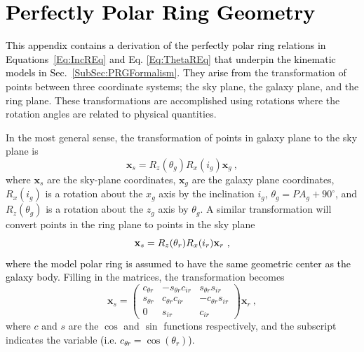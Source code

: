 \documentclass[fleqn,usenatbib]{mnras}
\newcommand{\KS}[1]{\textcolor{black}{#1}}
\begin{document}
\section{\KS{Perfectly Polar Ring Geometry}}\label{Sec:Appendix_PRMath}

\KS{This appendix contains a derivation of the perfectly polar ring relations in Equations~\ref{Eq:IncREq} and Eq. \ref{Eq:ThetaREq} that underpin the kinematic models in Sec.~\ref{SubSec:PRGFormalism}. They arise from} the transformation of points between three coordinate systems; the sky plane, the galaxy plane, and the ring plane.  These transformations are accomplished using rotations where the rotation angles are related to physical quantities.

In the most general sense, the transformation of points in galaxy plane to the sky plane is
\begin{equation}
    \mathbf{x}_{s}=R_{z}(\theta_{g})R_{x}(i_{g})\mathbf{x}_{g}~,
    \label{Eq:GalaxyToSky}
\end{equation}
where $\mathbf{x}_{s}$ are the sky-plane coordinates, $\mathbf{x}_{g}$ are the galaxy plane coordinates, $R_{x}(i_{g})$ is a rotation about the $x_{g}$ axis by the inclination $i_{g}$, $\theta_{g}=PA_{g}+90^{\circ}$, and $R_{z}(\theta_{g})$ is a rotation about the $z_{g}$ axis by $\theta_{g}$.  
A similar transformation will convert points in the ring plane to points in the sky plane 
\begin{equation}
    \mathbf{x}_{\textcolor{black}{s}}=R_{z}(\theta_{r})R_{x}(i_{r})\mathbf{x}_{r}~,
\end{equation}
\KS{where the model polar ring is assumed to have the same geometric center as the galaxy body.}  Filling in the matrices, the transformation becomes
\begin{equation}
    \mathbf{x}_{s}=
    \left(
    \begin{matrix}
    c_{\theta r} & -s_{\theta r}c_{ir} & s_{\theta r}s_{ir}\\
    s_{\theta r} & c_{\theta r}c_{ir} & -c_{\theta r}s_{ir}\\
    0 & s_{ir} & c_{ir}
    \end{matrix}
    \right)
    \mathbf{x}_{r}~,
    \label{Eq:RingRotMatrix}
\end{equation}
where $c$ and $s$ are the $\cos$ and $\sin$ functions respectively, and the subscript indicates the variable \textcolor{black}{(i.e. $c_{\theta r}=\cos(\theta_{r})$)}.
\end{document}
